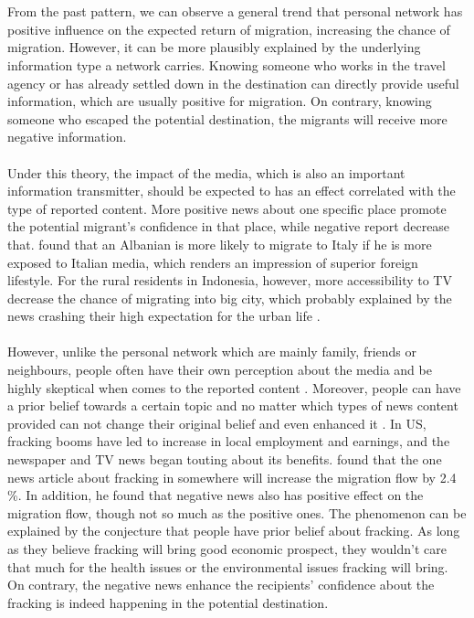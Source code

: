 \documentclass{article}
\begin{document}
\\~\\
From the past pattern, we can observe a general trend that personal network has positive influence on the expected return of migration, increasing the chance of migration. However, it can be more plausibly explained by the underlying information type a network carries. Knowing someone who works in the travel agency or has already settled down in the destination can directly provide useful information, which are usually positive for migration. On contrary, knowing someone who escaped the potential destination, the migrants will receive more negative information.
\\~\\
Under this theory, the impact of the media, which is also an important information transmitter, should be expected to has an effect correlated with the type of reported  content. More positive news about one specific place promote the potential migrant's confidence in that place, while negative report decrease that. \textcite{Braga:2007m} found that an Albanian is more likely to migrate to Italy if he is more exposed to Italian media, which renders an impression of superior foreign lifestyle. For the rural residents in Indonesia, however, more accessibility to TV decrease the chance of migrating into big city, which probably explained by the news crashing their high expectation for the urban life \parencite{Farré:2013fm}.
\\~\\
However, unlike the personal network which are mainly family, friends or neighbours, people often  have their own perception about the media and be highly skeptical when comes to the reported content \parencite{Kiousis:2001kp}.  Moreover, people can have a prior belief towards a certain topic and no matter which types of news content provided can not change their original belief and even enhanced it \parencite{Sambrook:2021sk}. In US, fracking booms have led to increase in local employment and earnings, and the newspaper and TV news began touting about its benefits. \textcite{Wilson:2021wi} found that the one news article about fracking in somewhere will increase the migration flow by 2.4 \%. In addition, he found that negative news also has positive effect on the migration flow, though not so much as the positive ones. The phenomenon can be explained by the conjecture that people have prior belief about fracking. As long as they believe fracking will bring good economic prospect, they wouldn't care that much for the health issues or the environmental issues fracking will bring. On contrary, the negative news enhance the recipients' confidence about the fracking is indeed happening in the potential destination.
\end{document}
